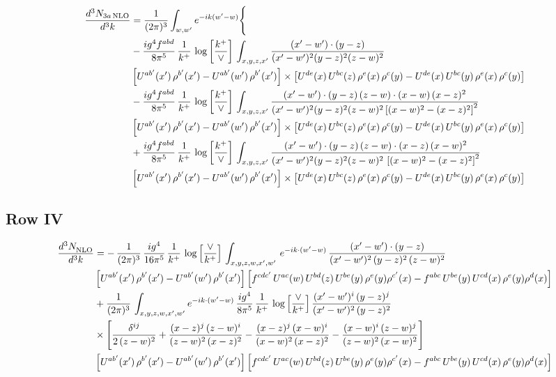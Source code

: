 \documentclass[9pt]{article}
\numberwithin{equation}{section}
\begin{document}
\begin{align}
\frac{d^{3}N_{3a\,\rm NLO}}{d^{3}k} & =\frac{1}{(2\pi)^{3}}\int_{w,w'}e^{-ik(w'-w)}\Bigg\{\notag \\ &  -\frac{ig^{4}f^{abd}}{8\pi^{5}}\,\frac{1}{k^{+}}\, \log{\left[\frac{k^{+}}{\vee}\right]}\,\int_{x,y,z,x'}
\frac{(x'-w')\cdot(y-z)}{(x'-w')^{2}(y-z)^{2}(z-w)^{2}}\notag \\ & \left[U^{ab'}(x')\,\rho^{b'}(x')-U^{ab'}(w')\, \rho^{b'}(x')\right]\times \left[U^{de}(x)\,U^{bc}(z)\, \rho^{e}(x)\,\rho^{c}(y)-U^{de}(x)\,U^{bc}(y)\,\rho^{e}(x)\,\rho^{c}(y)\right]\notag \\ & -\frac{ig^{4}f^{abd}}{8\pi^{5}}\,\frac{1}{k^{+}}\, \log{\left[\frac{k^{+}}{\vee}\right]}\,\int_{x,y,z,x'}
\frac{(x'-w')\cdot(y-z)\,(z-w)\cdot(x-w)\,(x-z)^{2}}{(x'-w')^{2}(y-z)^{2}(z-w)^{2}\left[(x-w)^{2}-(x-z)^{2}\right]^{2}}\notag \\ & \left[U^{ab'}(x')\,\rho^{b'}(x')-U^{ab'}(w')\, \rho^{b'}(x')\right]\times \left[U^{de}(x)\,U^{bc}(z)\, \rho^{e}(x)\,\rho^{c}(y)-U^{de}(x)\,U^{bc}(y)\,\rho^{e}(x)\,\rho^{c}(y)\right]\notag \\ & +\frac{ig^{4}f^{abd}}{8\pi^{5}}\,\frac{1}{k^{+}}\, \log{\left[\frac{k^{+}}{\vee}\right]}\,\int_{x,y,z,x'}
\frac{(x'-w')\cdot(y-z)\,(z-w)\cdot(x-z)\,(x-w)^{2}}{(x'-w')^{2}(y-z)^{2}(z-w)^{2}\,\left[(x-w)^{2}-(x-z)^{2}\right]^{2}}\notag \\ & \left[U^{ab'}(x')\,\rho^{b'}(x')-U^{ab'}(w')\, \rho^{b'}(x')\right]\times \left[U^{de}(x)\,U^{bc}(z)\, \rho^{e}(x)\,\rho^{c}(y)-U^{de}(x)\,U^{bc}(y)\,\rho^{e}(x)\,\rho^{c}(y)\right]
\end{align}
\subsection{Row IV}
\begin{align}
    \frac{d^{3}N_{\rm NLO}^{\rm}}{d^{3}k}  & = -\, \frac{1}{(2\pi)^{3}}\,\frac{ig^{4}}{16\pi^{5}}\,\frac{1}{k^{+}}\,\log{\left[\frac{\vee}{k^{+}}\right]}\,
    \int_{x,y,z,w,x',w'}\,e^{-ik\cdot (w^\prime-w)}\, \frac{(x'-w')\cdot (y-z)}{(x'-w')^{2}\,(y-z)^{2}\,(z-w)^{2}}\notag \\ &   \left[U^{ab'}(x')\,\rho^{b'}(x')-U^{ab'}(w')\,\rho^{b'}(x')\right] \left[f^{cdc'}\,U^{ac}(w)\,U^{bd}(z)\,U^{be}(y)\,\rho^{e}(y)\rho^{c'}(x)-f^{abc}\,U^{be}(y)\,U^{cd}(x)\,\rho^{e}(y)\rho^{d}(x)\right]
\notag \\ & +\frac{1}{(2\pi)^{3}}\,\int_{x,y,z,w,x',w'}e^{-ik\cdot (w^\prime-w)}\,\frac{ig^{4}}{8\pi^{5}}\,\frac{1}{k^{+}}\,\log{\left[\frac{\vee}{k^{+}}\right]}\,\frac{(x'-w')^{i}\,(y-z)^{j}}{(x'-w')^{2}\,(y-z)^{2}}\notag \\ & \times \Bigg[\frac{\delta^{ij}}{2\,(z-w)^{2}}+\frac{(x-z)^{j}\,(z-w)^{i}}{(z-w)^{2}\,(x-z)^{2}}-\frac{(x-z)^{j}\,(x-w)^{i}}{(x-w)^{2}\,(x-z)^{2}}-\frac{(x-w)^{i}\,(z-w)^{j}}{(z-w)^{2}\,(x-w)^{2}}\Bigg]\notag \\ & \left[U^{ab'}(x')\,\rho^{b'}(x')-U^{ab'}(w')\,\rho^{b'}(x')\right] \left[f^{cdc'}\,U^{ac}(w)\,U^{bd}(z)\,U^{be}(y)\,\rho^{e}(y)\rho^{c'}(x)-f^{abc}\,U^{be}(y)\,U^{cd}(x)\,\rho^{e}(y)\rho^{d}(x)\right]
\end{align}
\end{document}
